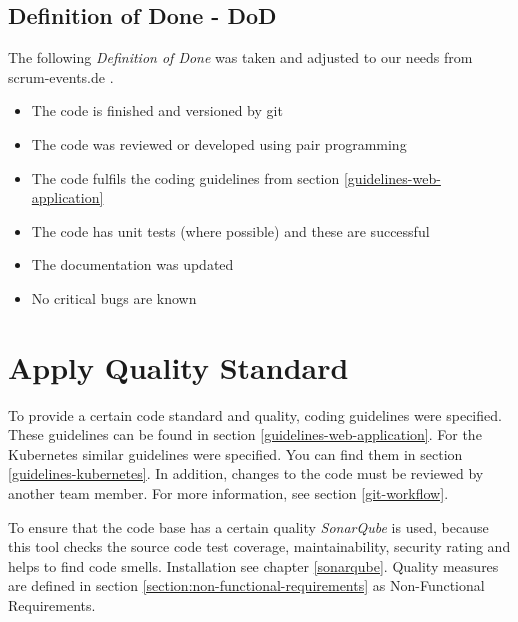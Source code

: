 \subsection{Definition of Done - DoD}
The following \textit{Definition of Done} was taken and adjusted to our needs from scrum-events.de \cite{www.scrum-events.de_dod}.
\begin{itemize}
  \item The code is finished and versioned by git
  \item The code was reviewed or developed using pair programming
  \item The code fulfils the coding guidelines from section \ref{guidelines-web-application}
  \item The code has unit tests (where possible) and these are successful
  \item The documentation was updated
  \item No critical bugs are known
\end{itemize}

\section{Apply Quality Standard}
To provide a certain code standard and quality, coding guidelines were specified.
These guidelines can be found in section \ref{guidelines-web-application}.
For the Kubernetes similar guidelines were specified.
You can find them in section \ref{guidelines-kubernetes}.
In addition, changes to the code must be reviewed by another team member.
For more information, see section \ref{git-workflow}.

To ensure that the code base has a certain quality \textit{SonarQube} is used, because this tool checks the source code test coverage, maintainability, security rating and helps to find code smells.
Installation see chapter \ref{sonarqube}.
Quality measures are defined in section \ref{section:non-functional-requirements} as Non-Functional Requirements.